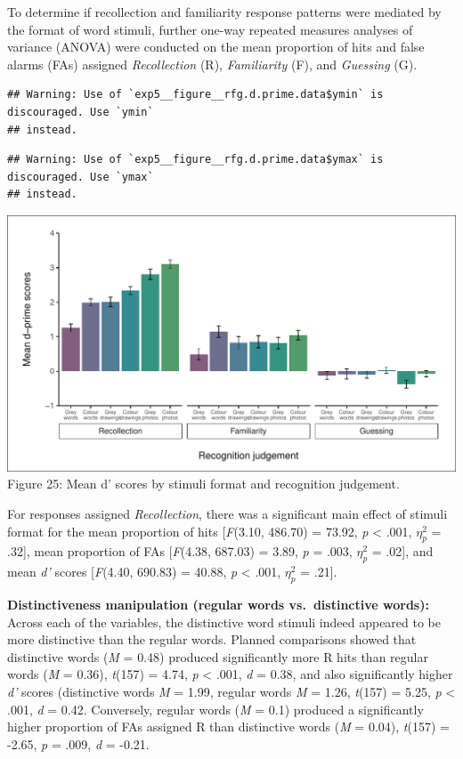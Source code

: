 \documentclass[
  11pt,
]{article}
\begin{document}
To determine if recollection and familiarity response patterns were
mediated by the format of word stimuli, further one-way repeated
measures analyses of variance (ANOVA) were conducted on the mean
proportion of hits and false alarms (FAs) assigned \emph{Recollection}
(R), \emph{Familiarity} (F), and \emph{Guessing} (G).

\begin{verbatim}
## Warning: Use of `exp5__figure__rfg.d.prime.data$ymin` is discouraged. Use `ymin`
## instead.
\end{verbatim}

\begin{verbatim}
## Warning: Use of `exp5__figure__rfg.d.prime.data$ymax` is discouraged. Use `ymax`
## instead.
\end{verbatim}

\includegraphics{R--Thesis_files/figure-latex/unnamed-chunk-91-1.pdf}
Figure 25: Mean d' scores by stimuli format and recognition judgement.

\newpage

For responses assigned \emph{Recollection}, there was a significant main
effect of stimuli format for the mean proportion of hits
{[}\emph{F}(3.10, 486.70) = 73.92, \emph{p} \textless{} .001,
\(\eta^2_p\) = .32{]}, mean proportion of FAs {[}\emph{F}(4.38, 687.03)
= 3.89, \emph{p} = .003, \(\eta^2_p\) = .02{]}, and mean \emph{d'}
scores {[}\emph{F}(4.40, 690.83) = 40.88, \emph{p} \textless{} .001,
\(\eta^2_p\) = .21{]}.

\textbf{Distinctiveness manipulation (regular words vs.~distinctive
words):} Across each of the variables, the distinctive word stimuli
indeed appeared to be more distinctive than the regular words. Planned
comparisons showed that distinctive words (\emph{M} = 0.48) produced
significantly more R hits than regular words (\emph{M} = 0.36),
\emph{t}(157) = 4.74, \emph{p} \textless{} .001, \emph{d} = 0.38, and
also significantly higher \emph{d'} scores (distinctive words \emph{M} =
1.99, regular words \emph{M} = 1.26, \emph{t}(157) = 5.25, \emph{p}
\textless{} .001, \emph{d} = 0.42. Conversely, regular words (\emph{M} =
0.1) produced a significantly higher proportion of FAs assigned R than
distinctive words (\emph{M} = 0.04), \emph{t}(157) = -2.65, \emph{p} =
.009, \emph{d} = -0.21.
\end{document}
